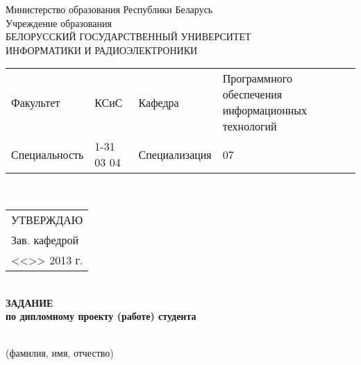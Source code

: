 {
  \thispagestyle{empty}
  \setlength{\parindent}{0em}

  \newcommand{\lineunderscore}{\uline{\hspace*{\fill}}}

  \begin{center}
    Министерство образования Республики Беларусь\\
    Учреждение образования\\
    БЕЛОРУССКИЙ ГОСУДАРСТВЕННЫЙ УНИВЕРСИТЕТ \\
    ИНФОРМАТИКИ И РАДИОЭЛЕКТРОНИКИ\\[1em]
  

  \begin{minipage}{\textwidth}
    \begin{flushleft}
      \begin{tabular}{ p{}p{}p{}p{} @{} }
        Факультет & КСиС & Кафедра & Программного обеспечения информационных технологий \\
        Специальность   & 1-31 03 04 & Специализация & 07
      \end{tabular}
    \end{flushleft}
  \end{minipage}\\[1em]

  \begin{minipage}{\textwidth}
    \begin{flushright}
      \begin{tabular}{p{}}
        УТВЕРЖДАЮ \\[0.5em]
        \underline{\hspace*{7em}} Зав. кафедрой \\
        <<\underline{\hspace*{4ex}}>> \underline{\hspace*{7em}} 2013 г.
      \end{tabular}
    \end{flushright}
  \end{minipage}\\[1em]

  \textbf{ЗАДАНИЕ} \\
  \textbf{по дипломному проекту (работе) студента}

  \lineunderscore \\
  {\small (фамилия, имя, отчество) }

  \end{center}

}
